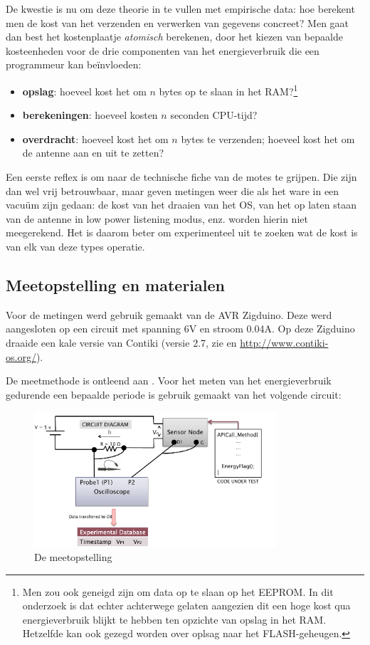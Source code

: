 \documentclass[11pt]{article}
\begin{document}
De kwestie is nu om deze theorie in te vullen met empirische data: hoe berekent
men de kost van het verzenden en verwerken van gegevens concreet? Men gaat dan
best het kostenplaatje \textit{atomisch} berekenen, door het kiezen van bepaalde
kosteenheden voor de drie componenten van het energieverbruik die een
programmeur kan be\"invloeden:

\begin{itemize}
\item \textbf{opslag}: hoeveel kost het om $n$ bytes op te slaan in het RAM?\footnote{Men zou ook geneigd zijn om data op te slaan op het EEPROM. In dit onderzoek is dat echter achterwege gelaten aangezien dit een hoge kost qua energieverbruik blijkt te hebben ten opzichte van opslag in het RAM. Hetzelfde kan ook gezegd worden over oplsag naar het FLASH-geheugen.}
\item \textbf{berekeningen}: hoeveel kosten $n$ seconden CPU-tijd?
\item \textbf{overdracht}: hoeveel kost het om $n$ bytes te verzenden; hoeveel
kost het om de antenne aan en uit te zetten?
\end{itemize}

Een eerste reflex is om naar de technische fiche van de motes te grijpen. Die
zijn dan wel vrij betrouwbaar, maar geven metingen weer die als het ware in een
vacu\"um zijn gedaan: de kost van het draaien van het OS, van het op laten staan
van de antenne in low power listening modus, enz. worden hierin niet
meegerekend. Het is daarom beter om experimenteel uit te zoeken wat de kost is
van elk van deze types operatie.

\subsection{Meetopstelling en materialen}

Voor de metingen werd gebruik gemaakt van de AVR Zigduino. Deze werd
aangesloten op een circuit met spanning 6V en stroom 0.04A.
Op deze Zigduino draaide een kale versie van Contiki (versie 2.7, zie \cite{dunkels2004contiki} en \url{http://www.contiki-os.org/}).

De meetmethode is ontleend aan \cite{hughes2013energy}. Voor het meten van het
energieverbruik gedurende een bepaalde periode is gebruik gemaakt van het
volgende circuit:

\begin{figure}[h]
\centering
\includegraphics[width=9cm]{meetopstelling}
\caption{De meetopstelling }
\label{fig:meetopstelling}
\end{figure}
\end{document}
